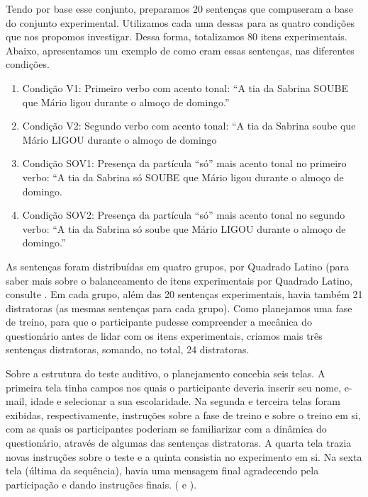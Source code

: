 \documentclass{textolivre}
\begin{document}
Tendo por base esse conjunto, preparamos 20 sentenças que compuseram a base do conjunto experimental. Utilizamos cada uma dessas para as quatro condições que nos propomos investigar. Dessa forma, totalizamos 80 itens experimentais. Abaixo, apresentamos um exemplo de como eram essas sentenças, nas diferentes condições.

\begin{enumerate}[label={(\arabic*)},leftmargin=2\parindent,topsep=10pt,resume]
\item Condição V1: Primeiro verbo com acento tonal: \newline
“A tia da Sabrina SOUBE que Mário ligou durante o almoço de domingo.”
\item Condição V2: Segundo verbo com acento tonal: \newline
“A tia da Sabrina soube que Mário LIGOU durante o almoço de domingo
\item Condição SOV1: Presença da partícula “só” mais acento tonal no primeiro verbo: \newline
“A tia da Sabrina só SOUBE que Mário ligou durante o almoço de domingo.
\item Condição SOV2: Presença da partícula “só” mais acento tonal no segundo verbo: \newline
“A tia da Sabrina só soube que Mário LIGOU durante o almoço de domingo.”
\end{enumerate}

As sentenças foram distribuídas em quatro grupos, por Quadrado Latino (para saber mais sobre o balanceamento de itens experimentais por Quadrado Latino, consulte \textcite{abbuhl2014}. Em cada grupo, além das 20 sentenças experimentais, havia também 21 distratoras (as mesmas sentenças para cada grupo). Como planejamos uma fase de treino, para que o participante pudesse compreender a mecânica do questionário antes de lidar com os itens experimentais, criamos mais três sentenças distratoras, somando, no total, 24 distratoras.

Sobre a estrutura do teste auditivo, o planejamento concebia seis telas. A primeira tela tinha campos nos quais o participante deveria inserir seu nome, e-mail, idade e selecionar a sua escolaridade. Na segunda e terceira telas foram exibidas, respectivamente, instruções sobre a fase de treino e sobre o treino em si, com as quais os participantes poderiam se familiarizar com a dinâmica do questionário, através de algumas das sentenças distratoras. A quarta tela trazia novas instruções sobre o teste e a quinta consistia no experimento em si. Na sexta tela (última da sequência), havia uma mensagem final agradecendo pela participação e dando instruções finais. ( e ).
\end{document}
